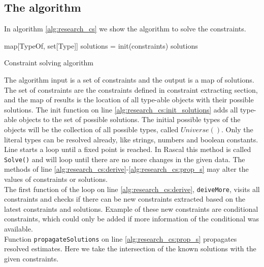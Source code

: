 \documentclass[../main.tex]{subfiles}
\begin{document}
    \subsection{The algorithm}
    In algorithm \ref{alg:research_cs} we show the algorithm to solve the constraints.
        
    \vspace{5 mm}
    \begin{algorithm}[H]
     \BlankLine
	 map[TypeOf, set[Type]] solutions = init(constraints)\;           \label{alg:research_cs:init_solutions}
     \BlankLine
	                                                                  \label{alg:research_cs:loop_end}
	 \BlankLine
	 \Return solutions\;     \label{alg:research_cs:return}
	 \caption{Constraint solving algorithm}
	 \label{alg:research_cs}
	\end{algorithm}
    
    
    The algorithm input is a set of constraints and the output is a map of solutions.
    The set of constraints are the constraints defined in constraint extracting section, and the map of results is the location of all type-able objects with their possible solutions.
    The init function on line \ref{alg:research_cs:init_solutions} adds all type-able objects to the set of possible solutions.
    The initial possible types of the objects will be the collection of all possible types, called $Universe()$.
    Only the literal types can be resolved already, like strings, numbers and boolean constants.
    \\
    Line \label{alg:research_cs:loop_start} starts a loop until a fixed point is reached. 
    In Rascal this method is called \texttt{Solve()} and will loop until there are no more changes in the given data.
    The methods of line \ref{alg:research_cs:derive}-\ref{alg:research_cs:prop_s} may alter the values of constraints or solutions.
    \\
    The first function of the loop on line \ref{alg:research_cs:derive}, \texttt{deiveMore}, visits all constraints and checks if there can be new constraints extracted based on the latest constraints and solutions.
    Example of these new constraints are conditional constraints, which could only be added if more information of the conditional was available.
    \\
    Function \texttt{propagateSolutions} on line \ref{alg:research_cs:prop_s} propagates resolved estimates. 
    Here we take the intersection of the known solutions with the given constraints.
\end{document}
